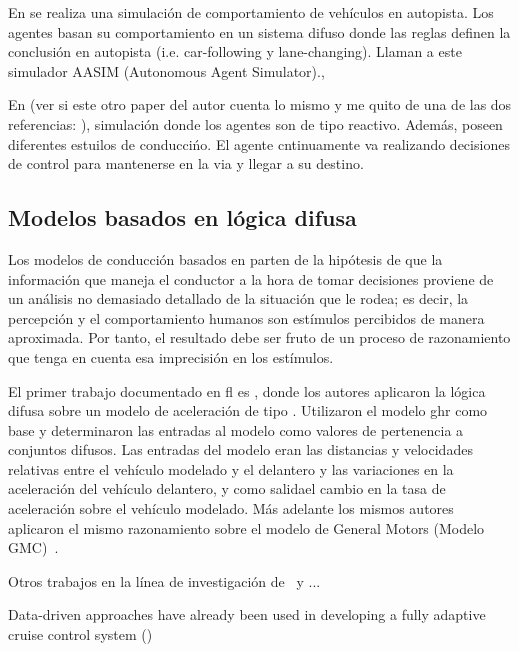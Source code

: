 En \cite{Das} se realiza una simulación de comportamiento de vehículos en autopista. Los agentes basan su comportamiento en un sistema difuso donde las reglas definen la conclusión en autopista (i.e. car-following y lane-changing). Llaman a este simulador AASIM (Autonomous Agent Simulator).,

En \cite{Ehlert2001} (ver si este otro paper del autor cuenta lo mismo y me quito de una de las dos referencias: \cite{Ehlert2001-2}), simulación donde los agentes son de tipo reactivo. Además, poseen diferentes estuilos de conduccińo. El agente cntinuamente va realizando decisiones de control para mantenerse en la via y llegar a su destino.


\subsection{Modelos basados en lógica difusa}

Los modelos de conducción basados en  parten de la hipótesis de que la información que maneja el conductor a la hora de tomar decisiones proviene de un análisis no demasiado detallado de la situación que le rodea; es decir, la percepción y el comportamiento humanos son estímulos percibidos de manera aproximada. Por tanto, el resultado debe ser fruto de un proceso de razonamiento que tenga en cuenta esa imprecisión en los estímulos.

El primer trabajo documentado en \gls{fl} es \cite{Kikuchi1992}, donde los autores aplicaron la lógica difusa sobre un modelo de aceleración de tipo \textit{}. Utilizaron el modelo \gls{ghr} como base y determinaron las entradas al modelo como valores de pertenencia a conjuntos difusos. Las entradas del modelo eran las distancias y velocidades relativas entre el vehículo modelado y el delantero y las variaciones en la aceleración del vehículo delantero, y como salidael cambio en la tasa de aceleración sobre el vehículo modelado. Más adelante los mismos autores aplicaron el mismo razonamiento sobre el modelo de General Motors (Modelo GMC)~\cite{Chakroborty1999}.

Otros trabajos en la línea de investigación de~\cite{Kikuchi1992} y \cite{Chakroborty1999}
...

Data-driven approaches have already been used in developing a fully adaptive cruise control system (\cite{Simonelli2009, Bifulco2014})

